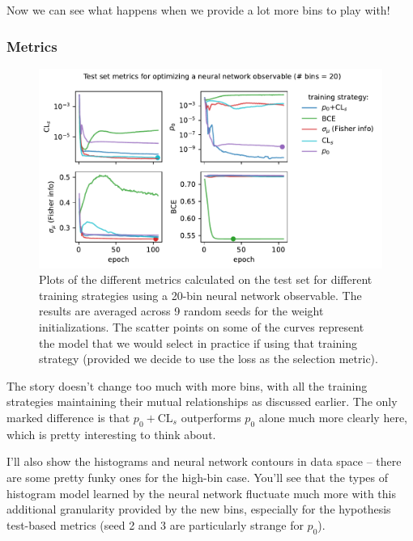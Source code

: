 \documentclass[
  11pt,
  numbers=noendperiod]{book}
\begin{document}
Now we can see what happens when we provide a lot more bins to play
with!

\hypertarget{metrics-1}{%
\subsubsection*{Metrics}\label{metrics-1}}

\begin{figure}

{\centering \includegraphics{./images/test_metricsmanynobins.pdf}

}

\caption{\label{fig-newneos-20bin-fixed}Plots of the different metrics
calculated on the test set for different training strategies using a
20-bin neural network observable. The results are averaged across 9
random seeds for the weight initializations. The scatter points on some
of the curves represent the model that we would select in practice if
using that training strategy (provided we decide to use the loss as the
selection metric).}

\end{figure}

The story doesn't change too much with more bins, with all the training
strategies maintaining their mutual relationships as discussed earlier.
The only marked difference is that \(p_0 + \mathrm{CL}_s\) outperforms
\(p_0\) alone much more clearly here, which is pretty interesting to
think about.

I'll also show the histograms and neural network contours in data space
-- there are some pretty funky ones for the high-bin case. You'll see
that the types of histogram model learned by the neural network
fluctuate much more with this additional granularity provided by the new
bins, especially for the hypothesis test-based metrics (seed 2 and 3 are
particularly strange for \(p_0\)).
\end{document}
